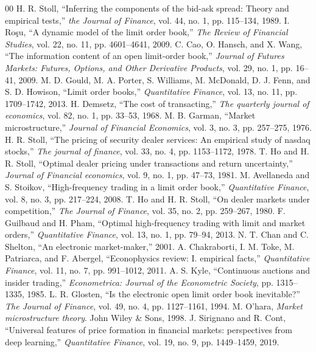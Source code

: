 \documentclass[conference]{IEEEtran}
\begin{document}
\begin{thebibliography}{00}
 H. R. Stoll, ``Inferring the components of the bid-ask spread: Theory and empirical tests,'' \textit{the Journal of Finance}, vol. 44, no. 1, pp. 115--134, 1989.
 I. Roşu, ``A dynamic model of the limit order book,'' \textit{The Review of Financial Studies}, vol. 22, no. 11, pp. 4601--4641, 2009.
 C. Cao, O. Hansch, and X. Wang, ``The information content of an open limit-order book,'' \textit{Journal of Futures Markets: Futures, Options, and Other Derivative Products}, vol. 29, no. 1, pp. 16--41, 2009.
 M. D. Gould, M. A. Porter, S. Williams, M. McDonald, D. J. Fenn, and S. D. Howison, ``Limit order books,'' \textit{Quantitative Finance}, vol. 13, no. 11, pp. 1709--1742, 2013.
 H. Demsetz, ``The cost of transacting,'' \textit{The quarterly journal of economics}, vol. 82, no. 1, pp. 33--53, 1968.
 M. B. Garman, ``Market microstructure,'' \textit{Journal of Financial Economics}, vol. 3, no. 3, pp. 257--275, 1976.
 H. R. Stoll, ``The pricing of security dealer services: An empirical study of nasdaq stocks,'' \textit{The journal of finance}, vol. 33, no. 4, pp. 1153--1172, 1978.
 T. Ho and H. R. Stoll, ``Optimal dealer pricing under transactions and return uncertainty,'' \textit{Journal of Financial economics}, vol. 9, no. 1, pp. 47--73, 1981.
 M. Avellaneda and S. Stoikov, ``High-frequency trading in a limit order book,'' \textit{Quantitative Finance}, vol. 8, no. 3, pp. 217--224, 2008.
 T. Ho and H. R. Stoll, ``On dealer markets under competition,'' \textit{The Journal of Finance}, vol. 35, no. 2, pp. 259--267, 1980.
 F. Guilbaud and H. Pham, ``Optimal high-frequency trading with limit and market orders,'' \textit{Quantitative Finance}, vol. 13, no. 1, pp. 79--94, 2013.
 N. T. Chan and C. Shelton, ``An electronic market-maker,'' 2001.
 A. Chakraborti, I. M. Toke, M. Patriarca, and F. Abergel, ``Econophysics review: I. empirical facts,'' \textit{Quantitative Finance}, vol. 11, no. 7, pp. 991--1012, 2011.
 A. S. Kyle, ``Continuous auctions and insider trading,'' \textit{Econometrica: Journal of the Econometric Society}, pp. 1315--1335, 1985.
 L. R. Glosten, ``Is the electronic open limit order book inevitable?'' \textit{The Journal of Finance}, vol. 49, no. 4, pp. 1127--1161, 1994.
 M. O'hara, \textit{Market microstructure theory}. John Wiley \& Sons, 1998.
 J. Sirignano and R. Cont, ``Universal features of price formation in financial markets: perspectives from deep learning,'' \textit{Quantitative Finance}, vol. 19, no. 9, pp. 1449--1459, 2019.

\end{thebibliography}
\end{document}
